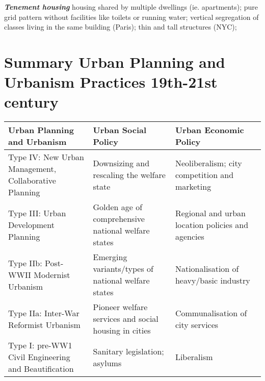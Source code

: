 \documentclass{article}
\newcommand{\bisection}[1]{\textbf{\textit{#1}}}
\begin{document}
\bisection{Tenement housing} housing shared by multiple dwellings (ie. apartments); pure grid pattern without facilities like toilets or running water; vertical segregation of classes living in the same building (Paris); thin and tall structures (NYC);

\pagebreak
\section{Summary Urban Planning and Urbanism Practices 19th-21st century}

\begin{center}
\begin{tabularx}{\textwidth} { 
  | >{\raggedright\arraybackslash}X 
  | >{\raggedright\arraybackslash}X 
  | >{\raggedright\arraybackslash}X | }
  \hline
  Urban Planning and Urbanism & Urban Social Policy & Urban Economic Policy \\ 
        \hline
  Type IV: New Urban Management, Collaborative Planning
  & Downsizing and rescaling the welfare state
  & Neoliberalism; city competition and marketing \\ 
      \hline
  Type III: Urban Development Planning
  & Golden age of comprehensive national welfare states
  & Regional and urban location policies and agencies \\ 
      \hline
  Type IIb: Post-WWII Modernist Urbanism 
  & Emerging variants/types of national welfare states
  & Nationalisation of heavy/basic industry \\ 
    \hline
  Type IIa: Inter-War Reformist Urbanism 
  & Pioneer welfare services and social housing in cities 
  & Communalisation of city services \\ 
  \hline
  Type I: pre-WW1 Civil Engineering and Beautification 
  & Sanitary legislation; asylums 
  & Liberalism \\ 
  \hline
\end{tabularx}
\end{center}
\end{document}
